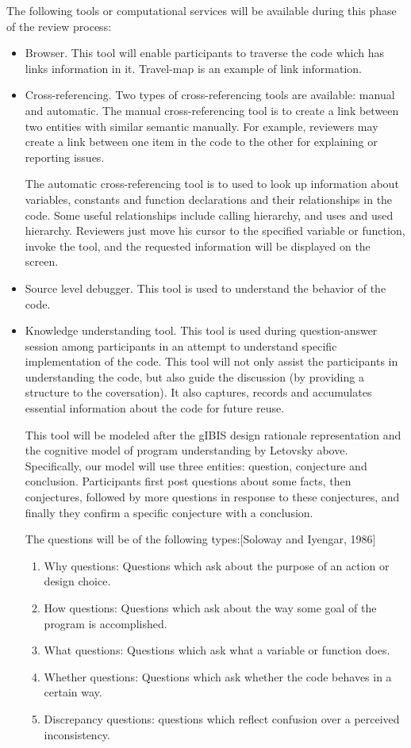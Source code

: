 \noindent The following tools or  computational services will be available
during this phase of the review process:
\begin {itemize}
\item Browser.  This tool will enable participants to traverse
the code which has links information in it.  Travel-map is
an example of link information.

\item Cross-referencing.
Two types of cross-referencing tools are available: manual and automatic.
The manual cross-referencing tool is to create 
a link between two entities with similar semantic manually.
For example, reviewers may create
a link between one item in the code to the other for explaining
or reporting issues.

The automatic cross-referencing tool is to used to look up 
information about variables,
constants and function declarations and their relationships 
in the code.
Some useful relationships include calling hierarchy, and
uses and used hierarchy.  
Reviewers just move his cursor to the specified variable or function,
invoke the tool, and  the requested information
will be displayed on the screen.

\item Source level debugger. This tool is used to understand
the behavior of the code.

\item Knowledge understanding tool.  This tool is used
during question-answer session among participants in an attempt to
understand specific implementation of the code.
This tool will not only assist the participants in understanding the code,
but also guide the discussion (by providing a structure to the coversation).
It also captures, records and accumulates essential information
about the code for future reuse.

This  tool will be modeled after the gIBIS design rationale representation
and the cognitive
model of program understanding by Letovsky above.
Specifically, our model will use three entities:
question, conjecture and conclusion.
Participants first post questions about some facts, then
conjectures, followed by more questions
in response to these conjectures,
and finally  they confirm  a specific conjecture with a conclusion.

The questions will be of the following types:[Soloway and Iyengar, 1986]
\begin {enumerate}
\item Why questions: Questions which ask about the purpose of an action
or design choice.
\item How questions: Questions which ask about the way some goal of
the program is accomplished.
\item What questions: Questions which ask what a variable or function does.
\item Whether questions: Questions which ask whether the code behaves
in a certain way.
\item Discrepancy questions: questions which reflect confusion over
a perceived inconsistency.
\end {enumerate}


\end{itemize}
